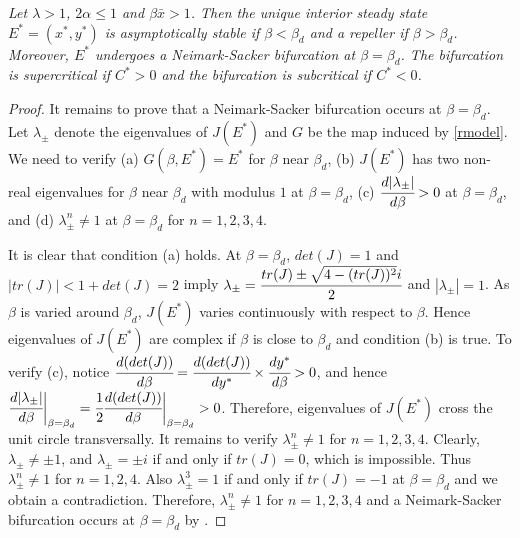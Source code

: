 \documentclass[11pt]{article}
\begin{document}
 {\em Let $\lambda>1$, $2\alpha\leq 1$
and $\beta \bar x>1$. Then the unique interior steady state
$E^*=(x^*, y^*)$ is asymptotically stable if $\beta<\beta_d$ and a
repeller if $\beta>\beta_d$. Moreover, $E^*$ undergoes a
Neimark-Sacker bifurcation at $\beta=\beta_d$. The bifurcation is
supercritical if $C^*>0$ and the bifurcation is subcritical if
$C^*<0$.}
\begin{proof} It remains to prove that a Neimark-Sacker
bifurcation  \cite{hale} occurs at $\beta=\beta_d$. Let
$\lambda_{\pm}$ denote the eigenvalues of $J(E^*)$ and $G$ be the
map induced by \eqref{rmodel}. We need to verify (a) $
 G(\beta, E^*)=E^*$ for $\beta$ near $\beta_d$, (b) $J(E^*)$ has two non-real eigenvalues for $\beta$ near $\beta_d$ with modulus $1$
 at $\beta=\beta_d$, (c) $\cfrac{d|\lambda_\pm|}{d\beta}>0$ at $\beta=\beta_d$, and (d) $\lambda_\pm^n\neq 1$ at $\beta=\beta_d$
for $n=1,2,3,4$.


It is clear that condition (a) holds. At $\beta=\beta_d$,
$det(J)=1$ and $|tr(J)|<1+det(J)=2$ imply
$\lambda_{\pm}=\cfrac{tr(J)\pm \sqrt{4-(tr(J))^2}i}{2}$ and
$|\lambda_{\pm}|=1$.
  As $\beta$ is varied around $\beta_d$, $J( E^*)$ varies continuously with respect to $\beta$. Hence eigenvalues of $J(E^*)$ are complex if
  $\beta$ is close to $\beta_d$ and condition (b) is true. To verify (c), notice
$\cfrac{d(det(J))}{d\beta}=\cfrac{d(det(J))}{dy^*}\times\cfrac{dy^*}{d\beta}>0$,
  and   hence  $\cfrac{d|\lambda_\pm|}{d\beta}\bigg|_{\beta=\beta_d}=\cfrac{1}{2}\cfrac{d(det(J))}{d\beta}\bigg|_{\beta=\beta_d}>0$.
 Therefore, eigenvalues of $J(E^*)$  cross the unit circle transversally. It
remains to verify $\lambda_{\pm}^n \neq 1$ for $n=1,2,3,4$.
Clearly, $\lambda_{\pm} \neq \pm 1$, and $\lambda_{\pm} = \pm i$
if and only if $tr(J)=0$,  which is impossible. Thus
$\lambda_{\pm}^n \neq 1$ for $n=1,2,4$. Also $\lambda_{\pm}^3=1$
if and only if  $tr(J)=-1$ at $\beta=\beta_d$ and we obtain a
contradiction.  Therefore, $\lambda_{\pm}^n \neq 1$ for $n=1,2,3,
4$ and a Neimark-Sacker bifurcation occurs at $\beta=\beta_d$ by
\cite{hale}.



\end{proof}
\end{document}
